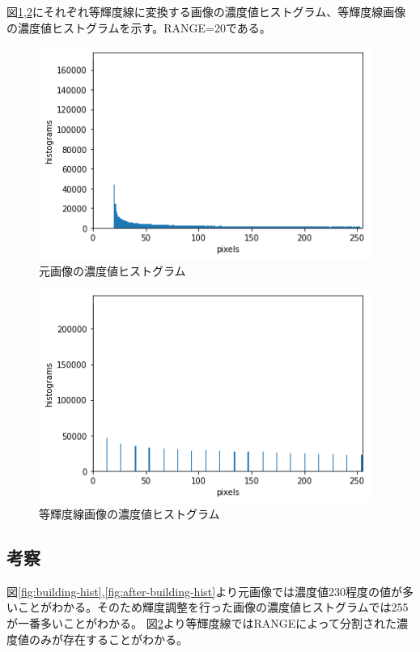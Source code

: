 \documentclass[11pt,a4paper,titlepage,dvipdfmx]{jarticle}
\begin{document}
      図\ref{fig:ham512-hist},\ref{fig:after-ham512-hist}にそれぞれ等輝度線に変換する画像の濃度値ヒストグラム、等輝度線画像の濃度値ヒストグラムを示す。RANGE=20である。
      \begin{figure}[H]
        \centering
        \includegraphics[scale=.8]{./ham512-hist.png}
        \caption{元画像の濃度値ヒストグラム}
        \label{fig:ham512-hist}
      \end{figure} 
      \begin{figure}[H]
        \centering
        \includegraphics[scale=.8]{./after-ham512-hist.png}
        \caption{等輝度線画像の濃度値ヒストグラム}
        \label{fig:after-ham512-hist}
      \end{figure} 

    \subsection{考察}
      図\ref{fig:building-hist},\ref{fig:after-building-hist}より元画像では濃度値230程度の値が多いことがわかる。そのため輝度調整を行った画像の濃度値ヒストグラムでは255が一番多いことがわかる。
      図\ref{fig:after-ham512-hist}より等輝度線ではRANGEによって分割された濃度値のみが存在することがわかる。
  
\end{document}
